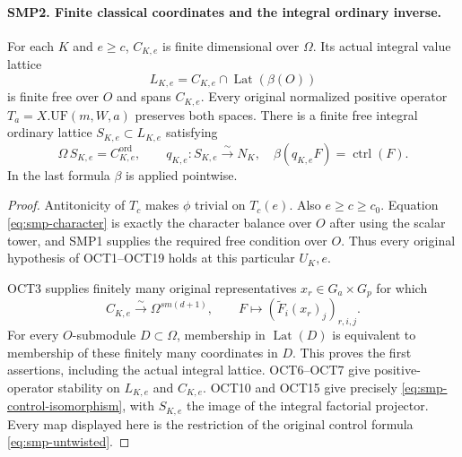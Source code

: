 \documentclass[11pt,a4paper]{article}
\numberwithin{equation}{section}
\theoremstyle{remark}\newtheorem{remark}[theorem]{Remark}
\begin{document}
\paragraph{SMP2. Finite classical coordinates and the integral ordinary inverse.}
\label{claim:SMP2}
For each $K$ and $e\geq c$, $C_{K,\allowbreak{} e}$ is finite
dimensional over $\Omega$.  Its actual integral value
lattice
\[
     L_{K,\allowbreak{} e}=C_{K,\allowbreak{} e}\cap\operatorname{Lat}(\beta(O))
\]
is finite free over $O$ and spans $C_{K,\allowbreak{} e}$.
Every original normalized positive operator
$T_a=X.\mathrm{UF}(m,\allowbreak{} W,\allowbreak{} a)$ preserves both spaces.
There is a finite free integral ordinary lattice
$S_{K,\allowbreak{} e}\subset L_{K,\allowbreak{} e}$ satisfying
\begin{equation}\label{eq:smp-control-isomorphism}
 \Omega\,\allowbreak{} S_{K,\allowbreak{} e}=C^{\mathrm{ord}}_{K,\allowbreak{} e},\qquad
 q_{K,\allowbreak{} e}:S_{K,\allowbreak{} e}\xrightarrow{\sim}N_K,
       \quad \beta(q_{K,\allowbreak{} e}F)=\operatorname{ctrl}(F).
\end{equation}
In the last formula $\beta$ is applied pointwise.
\begin{proof}
Antitonicity of $T_c$ makes $\phi$ trivial on $T_c(e)$.
Also $e\geq c\geq c_0$.  Equation
\eqref{eq:smp-character} is exactly the character
balance over $O$ after using the scalar tower, and
SMP1 supplies the required free condition over $O$.
Thus every original hypothesis of OCT1--OCT19 holds
at this particular $U_K,\allowbreak{} e$.

OCT3 supplies finitely many original representatives
$x_r\in G_a\times G_p$ for which
\begin{equation}\label{eq:smp-evaluation}
 C_{K,\allowbreak{} e}\xrightarrow{\sim}\Omega^{s m(d+1)},\qquad
            F\longmapsto(\widetilde F_i(x_r)_j)_{r,\allowbreak{} i,\allowbreak{} j}.
\end{equation}
For every $O$-submodule $D\subset\Omega$, membership
in $\operatorname{Lat}(D)$ is equivalent to membership
of these finitely many coordinates in $D$.
This proves the first assertions, including the actual
integral lattice.  OCT6--OCT7 give positive-operator
stability on $L_{K,\allowbreak{} e}$ and $C_{K,\allowbreak{} e}$.  OCT10 and OCT15
give precisely \eqref{eq:smp-control-isomorphism}, with
$S_{K,\allowbreak{} e}$ the image of the integral factorial projector.
Every map displayed here is the restriction of the
original control formula \eqref{eq:smp-untwisted}.
\end{proof}
\end{document}

